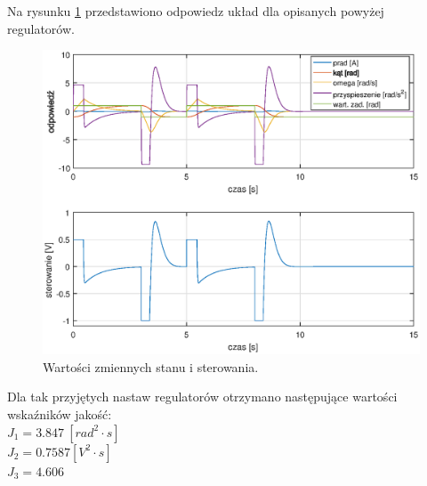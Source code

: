 Na rysunku \ref{pid_res} przedstawiono odpowiedz układ dla opisanych powyżej regulatorów.
\begin{figure}[h!]
	\centering
	\includegraphics[scale = 0.9]{fig/pid_response.eps}
	\caption		
	{Wartości zmiennych stanu i sterowania.}
	\label{pid_res}
\end{figure} 
Dla tak przyjętych nastaw regulatorów otrzymano następujące wartości wska\'zników jakość:\\
$J_1 = 3.847 \ [rad^2 \cdot s]$\\
$J_2 = 0.7587 [V^2 \cdot s]$\\
$J_3 = 4.606$\\


